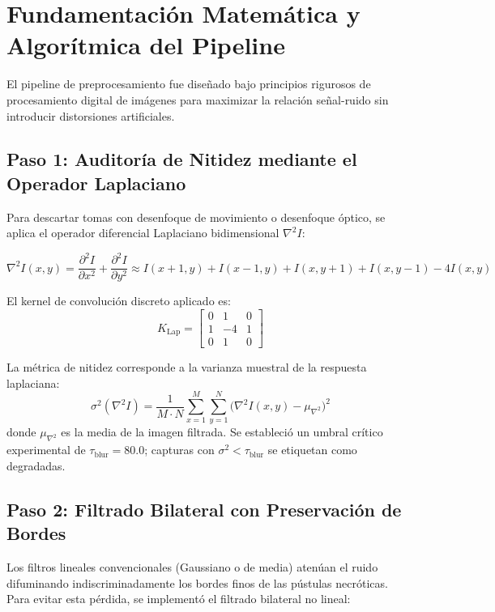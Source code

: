 \documentclass[12pt,a4paper]{article}
\begin{document}
\section{Fundamentación Matemática y Algorítmica del Pipeline}

El pipeline de preprocesamiento fue diseñado bajo principios rigurosos de procesamiento digital de imágenes para maximizar la relación señal-ruido sin introducir distorsiones artificiales.

\subsection{Paso 1: Auditoría de Nitidez mediante el Operador Laplaciano}
Para descartar tomas con desenfoque de movimiento o desenfoque óptico, se aplica el operador diferencial Laplaciano bidimensional $\nabla^2 I$:

\begin{equation}
\nabla^2 I(x, y) = \frac{\partial^2 I}{\partial x^2} + \frac{\partial^2 I}{\partial y^2} \approx I(x+1, y) + I(x-1, y) + I(x, y+1) + I(x, y-1) - 4I(x, y)
\end{equation}

El kernel de convolución discreto aplicado es:
\begin{equation}
K_{\text{Lap}} = \begin{bmatrix} 0 & 1 & 0 \\ 1 & -4 & 1 \\ 0 & 1 & 0 \end{bmatrix}
\end{equation}

La métrica de nitidez corresponde a la varianza muestral de la respuesta laplaciana:
\begin{equation}
\sigma^2(\nabla^2 I) = \frac{1}{M \cdot N} \sum_{x=1}^{M}\sum_{y=1}^{N} \Big(\nabla^2 I(x, y) - \mu_{\nabla^2}\Big)^2
\end{equation}
donde $\mu_{\nabla^2}$ es la media de la imagen filtrada. Se estableció un umbral crítico experimental de $\tau_{\text{blur}} = 80.0$; capturas con $\sigma^2 < \tau_{\text{blur}}$ se etiquetan como degradadas.

\subsection{Paso 2: Filtrado Bilateral con Preservación de Bordes}
Los filtros lineales convencionales (Gaussiano o de media) atenúan el ruido difuminando indiscriminadamente los bordes finos de las pústulas necróticas. Para evitar esta pérdida, se implementó el filtrado bilateral no lineal:
\end{document}
